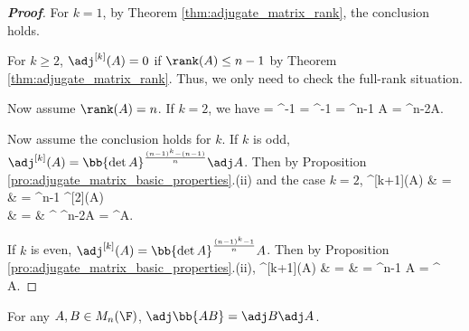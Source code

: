 \begin{proof}[\bf Proof]
For $k=1$, by Theorem \ref{thm:adjugate_matrix_rank}, the conclusion holds.

For $k\geq 2$, $\adj^{[k]}(A) = 0$ if $\rank(A)\leq n-1$ by Theorem \ref{thm:adjugate_matrix_rank}. Thus, we only need to check the full-rank situation.

Now assume $\rank(A)=n$. If $k=2$, we have
\be
\adj{} = \det{} ^{-1} = \det{} ^{-1} = ^{n-1} \det{} A = ^{n-2}A.
\ee

Now assume the conclusion holds for $k$. If $k$ is odd, $\adj^{[k]}(A) = \bb{\det A}^{\frac{(n-1)^k-(n-1)}{n}}\adj A$. Then by Proposition \ref{pro:adjugate_matrix_basic_properties}.(ii) and the case $k=2$,
\beast
\adj^{[k+1]}(A) & = & \adj{} = ^{n-1} \adj^{[2]}(A)\\
& = & ^{} ^{n-2}A = ^{}A.
\eeast

If $k$ is even, $\adj^{[k]}(A) = \bb{\det A}^{\frac{(n-1)^k-1}{n}} A$. Then by Proposition \ref{pro:adjugate_matrix_basic_properties}.(ii),
\beast
\adj^{[k+1]}(A) & = & \adj{} = ^{n-1} \adj A = ^{} \adj A.
\eeast
\end{proof}


\begin{theorem}\label{thm:adjugate_matrix_product}
For any $A,B\in M_n(\F)$, $\adj\bb{AB} = \adj B \adj A$.
\end{theorem}

